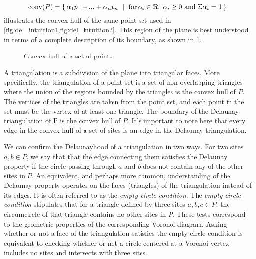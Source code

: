 \documentclass[12pt,twoside]{reedthesis}
\begin{document}

    \[
     \mbox{conv}(P) = \{\, \alpha_{1}p_{1} + ... + \alpha_{n}p_{n} \ \mid\ \text{for$ \,\alpha_{i} \in \Re, \; \alpha_{i} \geq 0$ and $\Sigma\alpha_{i} = 1$}\,\} 
    \]
     illustrates the convex hull of the same point set used in \cref{fig:del_intuition1,fig:del_intuition2}. 
    This region of the plane is best understood in terms of a complete description of its boundary, as shown in \cref{fig:convex_hull}.\par

    \begin{figure}[!htb]
      \centering
      
      \caption{Convex hull of a set of points}
      \label{fig:convex_hull}
    \end{figure}

    A triangulation is a subdivision of the plane into triangular faces. More specifically, the triangulation of a point-set is a set of non-overlapping triangles where the union of the regions bounded by the triangles is the convex hull of $P$. The vertices of the triangles are taken from the point set, and each point in the set must be the vertex of at least one triangle. The boundary of the Delaunay triangulation of P is the convex hull of $P$. It's important to note here that every edge in the convex hull of a set of sites is an edge in the Delaunay triangulation.\par

    We can confirm the Delaunayhood of a triangulation in two ways. For two sites $a, b \in P$, we say that that the edge connecting them satisfies the Delaunay property if the circle passing through $a$ and $b$ does not contain any of the other sites in $P$. An equivalent, and perhaps more common, understanding of the Delaunay property operates on the faces (triangles) of the triangulation instead of its edges. It is often referred to as the \emph{empty circle condition}. The \emph{empty circle condition} stipulates that for a triangle defined by three sites $a, b, c \in P$, the circumcircle of that triangle contains no other sites in $P$. These tests correspond to the geometric properties of the corresponding Voronoi diagram. Asking whether or not a face of the triangulation satisfies the empty circle condition is equivalent to checking whether or not a circle centered at a Voronoi vertex includes no sites and intersects with three sites.\par
\end{document}
